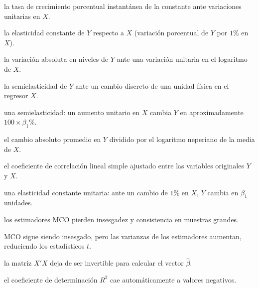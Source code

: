 \begin{opts}
    \item la tasa de crecimiento porcentual instantánea de la constante ante variaciones unitarias en $X$.
    \item la elasticidad constante de $Y$ respecto a $X$ (variación porcentual de $Y$ por $1\%$ en $X$).
    \item la variación absoluta en niveles de $Y$ ante una variación unitaria en el logaritmo de $X$.
    \item la semielasticidad de $Y$ ante un cambio discreto de una unidad física en el regresor $X$.
\end{opts}

\begin{opts}
    \item una semielasticidad: un aumento unitario en $X$ cambia $Y$ en aproximadamente $100 \times \beta_1\%$.
    \item el cambio absoluto promedio en $Y$ dividido por el logaritmo neperiano de la media de $X$.
    \item el coeficiente de correlación lineal simple ajustado entre las variables originales $Y$ y $X$.
    \item una elasticidad constante unitaria: ante un cambio de $1\%$ en $X$, $Y$ cambia en $\beta_1$ unidades.
\end{opts}

\begin{opts}
    \item los estimadores MCO pierden insesgadez y consistencia en muestras grandes.
    \item MCO sigue siendo insesgado, pero las varianzas de los estimadores aumentan, reduciendo los estadísticos $t$.
    \item la matriz $X'X$ deja de ser invertible para calcular el vector $\hat{\beta}$.
    \item el coeficiente de determinación $R^2$ cae automáticamente a valores negativos.
\end{opts}


